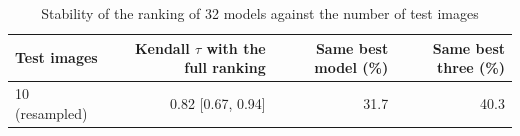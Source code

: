 \begin{table}[t]
\centering
\caption{Stability of the ranking of 32 models against the number of test images}
\label{tab:rankstability}
\small
\begin{tabular}{lrrr}
\toprule
Test images & Kendall $\tau$ with the full ranking & Same best model (\%) & Same best three (\%) \\
\midrule
10 (resampled) & 0.82 [0.67, 0.94] & 31.7 & 40.3 \\
\bottomrule
\end{tabular}
\par{}
\end{table}
